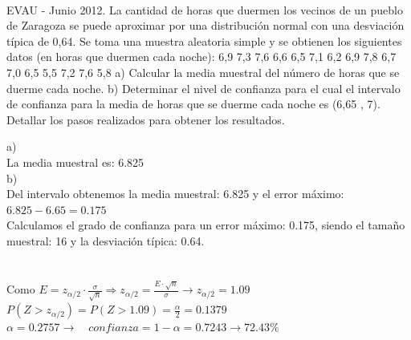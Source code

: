 \documentclass[spanish, 11pt]{exam}
\begin{document}
\begin{questions}
\begin{solution}
     \\
       \end{solution}\question EVAU - Junio 2012. La cantidad de horas que duermen los vecinos de un pueblo de Zaragoza se puede aproximar
por una distribución normal con una desviación típica de 0,64. Se toma una muestra aleatoria simple y se
obtienen los siguientes datos (en horas que duermen cada noche):
6,9 7,3 7,6 6,6 6,5 7,1 6,2 6,9 7,8 6,7 7,0 6,5 5,5 7,2 7,6 5,8
a) Calcular la media muestral del número de horas que se duerme cada noche.
b) Determinar el nivel de confianza para el cual el intervalo de confianza para la media de
horas que se duerme cada noche es (6,65 , 7). Detallar los pasos realizados para obtener los resultados. \begin{solution}   a) \\ La media muestral es: 6.825 \\b) \\ Del intervalo obtenemos la media muestral: 6.825 y el error máximo: $6.825-6.65=0.175$ \\ Calculamos el grado de confianza para un error máximo: 0.175, siendo el tamaño muestral: 16 y la desviación típica: 0.64. \\ \\  \\ Como $E=z_{\alpha / 2}\cdot \frac{\sigma}{\sqrt{n}} \Rightarrow z_{\alpha / 2} =\frac{E \cdot \sqrt{n}}{\sigma}\to z_{\alpha / 2}=1.09$ \\ $P(Z>z_{\alpha / 2})=P(Z>1.09)=\frac{\alpha}{2}=0.1379$ \\ $\alpha=0.2757 \to \quad confianza=1 - \alpha=0.7243 \to 72.43 \%$    \end{solution}
    \end{questions}
    
\end{document}
